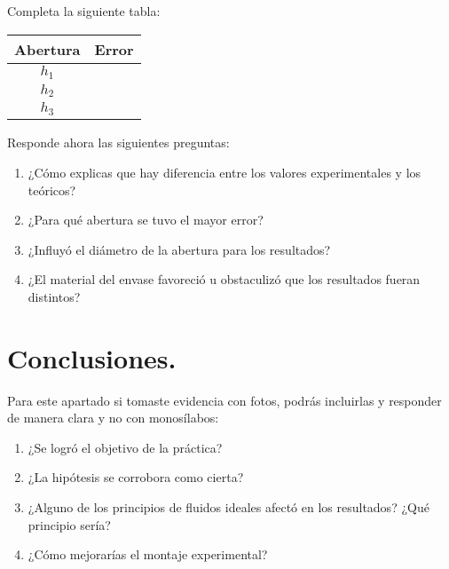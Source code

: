\documentclass[14pt]{extarticle}
\begin{document}
Completa la siguiente tabla:
\begin{table}[H]
\centering
\begin{tabular}{ | c | c |} \hline
Abertura & Error \\ \hline
$h_{1}$ & \\ \hline
$h_{2}$ & \\ \hline
$h_{3}$ & \\ \hline
\end{tabular}
\end{table}

Responde ahora las siguientes preguntas:
\begin{enumerate}[label=\arabic*)]
\item ¿Cómo explicas que hay diferencia entre los valores experimentales y los teóricos?
\item ¿Para qué abertura se tuvo el mayor error?
\item ¿Influyó el diámetro de la abertura para los resultados?
\item ¿El material del envase favoreció u obstaculizó que los resultados fueran distintos?
\end{enumerate}

\section{Conclusiones.}

Para este apartado si tomaste evidencia con fotos, podrás incluirlas y responder de manera clara y no con monosílabos:
\begin{enumerate}[label=\Roman*)]
\item ¿Se logró el objetivo de la práctica?
\item ¿La hipótesis se corrobora como cierta?
\item ¿Alguno de los principios de fluidos ideales afectó en los resultados? ¿Qué principio sería?
\item ¿Cómo mejorarías el montaje experimental?
\end{enumerate}
\end{document}
